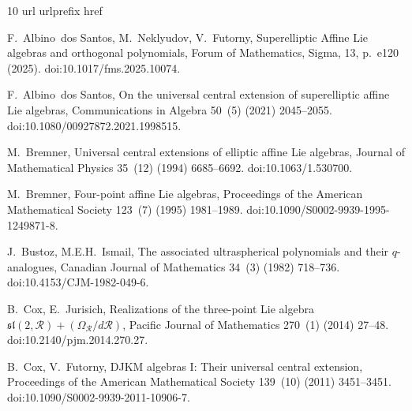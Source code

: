 \documentclass[final,nopreprintline]{elsarticle}
\theoremstyle{definition}
\numberwithin{equation}{section}
\theoremstyle{remark}
\begin{document}

\begin{thebibliography}{10}
\expandafter\ifx\csname url\endcsname\relax
  \def\url#1{\texttt{#1}}\fi
\expandafter\ifx\csname urlprefix\endcsname\relax\def\urlprefix{URL }\fi
\expandafter\ifx\csname href\endcsname\relax
  \def\href#1#2{#2} \def\path#1{#1}\fi

F.~Albino~dos Santos, M.~Neklyudov, V.~Futorny,
{Superelliptic Affine Lie algebras and orthogonal polynomials},
Forum of Mathematics, Sigma, 13, p.~e120 (2025).
\newblock \href{https://doi.org/10.1017/fms.2025.10074}{\path{doi:10.1017/fms.2025.10074}}.

F.~Albino~dos Santos,
{On the universal central extension of superelliptic affine Lie algebras},
Communications in Algebra 50~(5) (2021) 2045--2055.
\newblock \href{https://doi.org/10.1080/00927872.2021.1998515}{\path{doi:10.1080/00927872.2021.1998515}}.

M.~Bremner,
{Universal central extensions of elliptic affine Lie algebras},
Journal of Mathematical Physics 35~(12) (1994) 6685--6692.
\newblock \href{https://doi.org/10.1063/1.530700}{\path{doi:10.1063/1.530700}}.

M.~Bremner,
{Four-point affine Lie algebras},
Proceedings of the American Mathematical Society 123~(7) (1995) 1981--1989.
\newblock \href{https://doi.org/10.1090/S0002-9939-1995-1249871-8}{\path{doi:10.1090/S0002-9939-1995-1249871-8}}.

J.~Bustoz, M.E.H.~Ismail,
{The associated ultraspherical polynomials and their $q$-analogues},
Canadian Journal of Mathematics 34~(3) (1982) 718--736.
\newblock \href{https://doi.org/10.4153/CJM-1982-049-6}{\path{doi:10.4153/CJM-1982-049-6}}.

B.~Cox, E.~Jurisich,
{Realizations of the three-point Lie algebra $\mathfrak{sl}(2,\mathcal{R})+(\Omega_{\mathcal{R}}/d\mathcal{R})$},
Pacific Journal of Mathematics 270~(1) (2014) 27--48.
\newblock \href{https://doi.org/10.2140/pjm.2014.270.27}{\path{doi:10.2140/pjm.2014.270.27}}.

B.~Cox, V.~Futorny,
{DJKM algebras I: Their universal central extension},
Proceedings of the American Mathematical Society 139~(10) (2011) 3451--3451.
\newblock \href{https://doi.org/10.1090/S0002-9939-2011-10906-7}{\path{doi:10.1090/S0002-9939-2011-10906-7}}.


\end{thebibliography}
\end{document}
